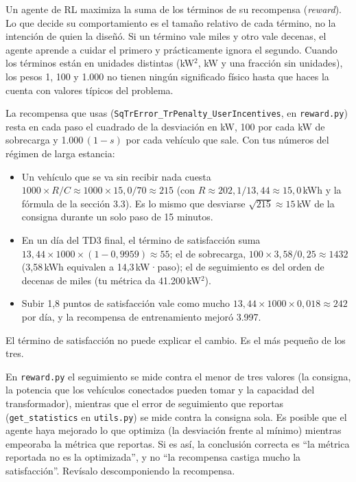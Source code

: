 \documentclass[11pt]{article}
\begin{document}
\begin{idea}
Un agente de RL maximiza la suma de los términos de su recompensa (\emph{reward}). Lo que decide su comportamiento es el tamaño relativo de cada término, no la intención de quien la diseñó. Si un término vale miles y otro vale decenas, el agente aprende a cuidar el primero y prácticamente ignora el segundo. Cuando los términos están en unidades distintas (kW$^2$, kW y una fracción sin unidades), los pesos 1, 100 y 1.000 no tienen ningún significado físico hasta que haces la cuenta con valores típicos del problema.

La recompensa que usas (\texttt{SqTrError\_TrPenalty\_UserIncentives}, en \texttt{reward.py}) resta en cada paso el cuadrado de la desviación en kW, 100 por cada kW de sobrecarga y 1.000\,$(1-s)$ por cada vehículo que sale. Con tus números del régimen de larga estancia:
\begin{itemize}[leftmargin=1.2em]
\item Un vehículo que se va sin recibir nada cuesta $1000 \times R/C \approx 1000 \times 15{,}0/70 \approx 215$ (con $R \approx 202{,}1/13{,}44 \approx 15{,}0$\,kWh y la fórmula de la sección 3.3). Es lo mismo que desviarse $\sqrt{215} \approx 15$\,kW de la consigna durante un solo paso de 15 minutos.
\item En un día del TD3 final, el término de satisfacción suma $13{,}44 \times 1000 \times (1 - 0{,}9959) \approx 55$; el de sobrecarga, $100 \times 3{,}58/0{,}25 \approx 1432$ (3,58\,kWh equivalen a 14,3\,kW·paso); el de seguimiento es del orden de decenas de miles (tu métrica da 41.200\,kW$^2$).
\item Subir 1,8 puntos de satisfacción vale como mucho $13{,}44 \times 1000 \times 0{,}018 \approx 242$ por día, y la recompensa de entrenamiento mejoró 3.997.
\end{itemize}
El término de satisfacción no puede explicar el cambio. Es el más pequeño de los tres.
\end{idea}

\begin{duda}
En \texttt{reward.py} el seguimiento se mide contra el menor de tres valores (la consigna, la potencia que los vehículos conectados pueden tomar y la capacidad del transformador), mientras que el error de seguimiento que reportas (\texttt{get\_statistics} en \texttt{utils.py}) se mide contra la consigna sola. Es posible que el agente haya mejorado lo que optimiza (la desviación frente al mínimo) mientras empeoraba la métrica que reportas. Si es así, la conclusión correcta es ``la métrica reportada no es la optimizada'', y no ``la recompensa castiga mucho la satisfacción''. Revísalo descomponiendo la recompensa.
\end{duda}
\end{document}
